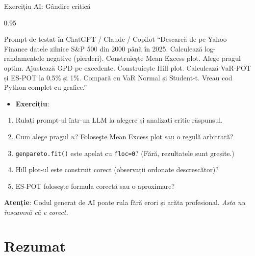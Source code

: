 \documentclass[9pt, aspectratio=169, t]{beamer}
\begin{document}
\begin{frame}{Exercițiu AI: Gândire critică}
    \begin{cminipage}{0.95\textwidth}
    \vspace{-3mm}
    \begin{block}{\footnotesize Prompt de testat în ChatGPT / Claude / Copilot}
        {\footnotesize
        ``Descarcă de pe Yahoo Finance datele zilnice S\&P 500 din 2000 până în 2025. Calculează log-randamentele negative (pierderi). Construiește Mean Excess plot. Alege pragul optim. Ajustează GPD pe excedente. Construiește Hill plot. Calculează VaR-POT și ES-POT la 0.5\% și 1\%. Compară cu VaR Normal și Student-t. Vreau cod Python complet cu grafice.''
        }
    \end{block}
    \vspace{-2mm}
    {\footnotesize
    \begin{itemize}\setlength{\itemsep}{0pt}
        \item \textbf{Exercițiu}:
    \end{itemize}
    \begin{enumerate}\setlength{\itemsep}{0pt}
        \item Rulați prompt-ul într-un LLM la alegere și analizați critic răspunsul.
        \item Cum alege pragul $u$? Foloseşte Mean Excess plot sau o regulă arbitrară?
        \item \texttt{genpareto.fit()} este apelat cu \texttt{floc=0}? (Fără, rezultatele sunt greșite.)
        \item Hill plot-ul este construit corect (observații ordonate descrescător)?
        \item ES-POT folosește formula corectă sau o aproximare?
    \end{enumerate}
    }
    \vspace{-2mm}
    \begin{alertblock}{}
        {\footnotesize \textbf{Atenție}: Codul generat de AI poate rula fără erori și arăta profesional. \textit{Asta nu înseamnă că e corect.}}
    \end{alertblock}
    \end{cminipage}
\end{frame}

\section{Rezumat}
\end{document}
